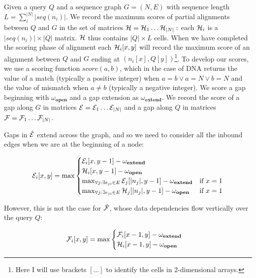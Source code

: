 \documentclass[a4paper,12pt,numbered,oneside]{Classes/PhDThesisPSnPDF}
\begin{document}
Given a query $Q$ and a sequence graph $G = (N, E)$ with sequence length $L=\sum_{i}^{|N|} |seq(n_i)|$.
We record the maximum scores of partial alignments between $Q$ and $G$ in the set of matrices ${\cal H} = {\cal H}_1 \ldots {\cal H}_{|N|} :$ each ${\cal H}_i$ is a $|seq(n_i)| \times |Q|$ matrix.
${\cal H}$ thus contains $|Q|\times L$ cells.
When we have completed the scoring phase of alignment each ${\cal H}_{i}[x,y]$ will record the maximum score of an alignment between $Q$ and $G$ ending at $(n_i[x], Q[y])$\footnote{Here I will use brackets $[\ldots]$ to identify the cells in 2-dimensional arrays.}.
To develop our scores, we use a scoring function $score(a, b)$, which in the case of DNA returns the value of a match (typically a positive integer) when $a = b \lor a = N \lor b = N$ and the value of mismatch when $a \neq b$ (typically a negative integer).
We score a gap beginning with $\omega_\textbf{open}$ and a gap extension as $\omega_\textbf{extend}$.
We record the score of a gap along $G$ in matrices ${\cal E} = {\cal E}_1 \ldots {\cal E}_{|N|}$ and a gap along $Q$ in matrices ${\cal F} = {\cal F}_1 \ldots {\cal F}_{|N|}$.

Gaps in $\hat{\cal E}$ extend across the graph, and so we need to consider all the inbound edges when we are at the beginning of a node:

\begin{equation}
  {\cal E}_i[x,y] = \max
  \begin{cases}
    {\cal E}_i[x,y-1] - \omega_\textbf{extend} \\
    {\cal H}_i[x,y-1] - \omega_\textbf{open} \\
    \max_{\forall j : \exists e_{ji} \in E} {\cal E}_j[|n_j|,y-1] - \omega_\textbf{extend} & \text{if } x = 1 \\
    \max_{\forall j : \exists e_{ji} \in E} {\cal H}_j[|n_j|,y-1] - \omega_\textbf{open} & \text{if } x = 1 \\
  \end{cases}
\end{equation}

However, this is not the case for $\hat{\cal F}$, whose data dependencies flow vertically over the query $Q$:

\begin{equation}
  {\cal F}_i[x,y] = \max
  \begin{cases}
    {\cal F}_i[x-1,y] - \omega_\textbf{extend} \\
    {\cal H}_i[x-1,y] - \omega_\textbf{open} \\
  \end{cases}
\end{equation}
\end{document}
